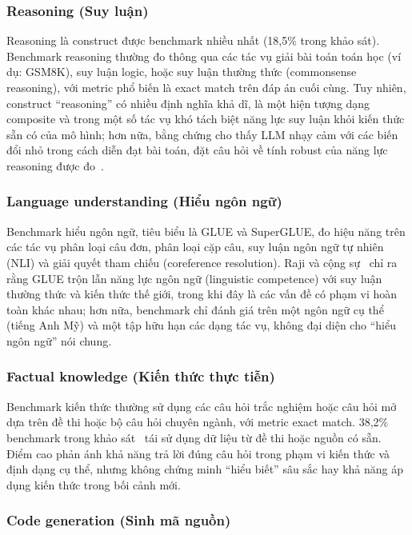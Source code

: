 \subsubsection{Reasoning (Suy luận)}

Reasoning là construct được benchmark nhiều nhất (18,5\% trong khảo sát). Benchmark reasoning thường đo thông qua các tác vụ giải bài toán toán học (ví dụ: GSM8K), suy luận logic, hoặc suy luận thường thức (commonsense reasoning), với metric phổ biến là exact match trên đáp án cuối cùng. Tuy nhiên, construct ``reasoning'' có nhiều định nghĩa khả dĩ, là một hiện tượng dạng composite và trong một số tác vụ khó tách biệt năng lực suy luận khỏi kiến thức sẵn có của mô hình; hơn nữa, bằng chứng cho thấy LLM nhạy cảm với các biến đổi nhỏ trong cách diễn đạt bài toán, đặt câu hỏi về tính robust của năng lực reasoning được đo~\cite{measuring_what_matters}.

\subsubsection{Language understanding (Hiểu ngôn ngữ)}

Benchmark hiểu ngôn ngữ, tiêu biểu là GLUE và SuperGLUE, đo hiệu năng trên các tác vụ phân loại câu đơn, phân loại cặp câu, suy luận ngôn ngữ tự nhiên (NLI) và giải quyết tham chiếu (coreference resolution). Raji và cộng sự~\cite{everything_benchmark} chỉ ra rằng GLUE trộn lẫn năng lực ngôn ngữ (linguistic competence) với suy luận thường thức và kiến thức thế giới, trong khi đây là các vấn đề có phạm vi hoàn toàn khác nhau; hơn nữa, benchmark chỉ đánh giá trên một ngôn ngữ cụ thể (tiếng Anh Mỹ) và một tập hữu hạn các dạng tác vụ, không đại diện cho ``hiểu ngôn ngữ'' nói chung.

\subsubsection{Factual knowledge (Kiến thức thực tiễn)}

Benchmark kiến thức thường sử dụng các câu hỏi trắc nghiệm hoặc câu hỏi mở dựa trên đề thi hoặc bộ câu hỏi chuyên ngành, với metric exact match. 38,2\% benchmark trong khảo sát~\cite{measuring_what_matters} tái sử dụng dữ liệu từ đề thi hoặc nguồn có sẵn. Điểm cao phản ánh khả năng trả lời đúng câu hỏi trong phạm vi kiến thức và định dạng cụ thể, nhưng không chứng minh ``hiểu biết'' sâu sắc hay khả năng áp dụng kiến thức trong bối cảnh mới.

\subsubsection{Code generation (Sinh mã nguồn)}

